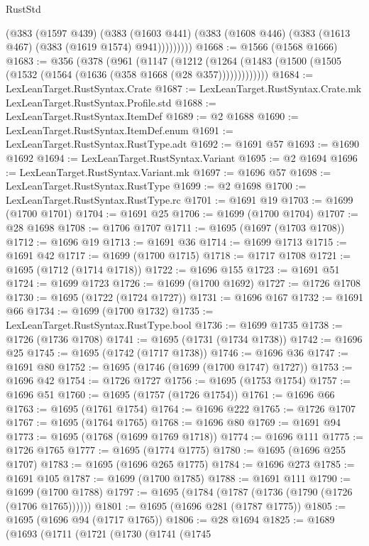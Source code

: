 \begin{lexlean}{RustStd}
\begin{coremodule}
            (@383
              (@1597 @439)
              (@383
                (@1603 @441)
                (@383 (@1608 @446) (@383 (@1613 @467) (@383 (@1619 @1574) @941)))))))))
@1668 := @1566 (@1568 @1666)
@1683 := @356
    (@378
      (@961
        (@1147
          (@1212 (@1264 (@1483 (@1500 (@1505 (@1532 (@1564 (@1636 (@358 @1668 (@28 @357)))))))))))))
@1684 := LexLeanTarget.RustSyntax.Crate
@1687 := LexLeanTarget.RustSyntax.Crate.mk LexLeanTarget.RustSyntax.Profile.std
@1688 := LexLeanTarget.RustSyntax.ItemDef
@1689 := @2 @1688
@1690 := LexLeanTarget.RustSyntax.ItemDef.enum
@1691 := LexLeanTarget.RustSyntax.RustType.adt
@1692 := @1691 @57
@1693 := @1690 @1692
@1694 := LexLeanTarget.RustSyntax.Variant
@1695 := @2 @1694
@1696 := LexLeanTarget.RustSyntax.Variant.mk
@1697 := @1696 @57
@1698 := LexLeanTarget.RustSyntax.RustType
@1699 := @2 @1698
@1700 := LexLeanTarget.RustSyntax.RustType.rc
@1701 := @1691 @19
@1703 := @1699 (@1700 @1701)
@1704 := @1691 @25
@1706 := @1699 (@1700 @1704)
@1707 := @28 @1698
@1708 := @1706 @1707
@1711 := @1695 (@1697 (@1703 @1708))
@1712 := @1696 @19
@1713 := @1691 @36
@1714 := @1699 @1713
@1715 := @1691 @42
@1717 := @1699 (@1700 @1715)
@1718 := @1717 @1708
@1721 := @1695 (@1712 (@1714 @1718))
@1722 := @1696 @155
@1723 := @1691 @51
@1724 := @1699 @1723
@1726 := @1699 (@1700 @1692)
@1727 := @1726 @1708
@1730 := @1695 (@1722 (@1724 @1727))
@1731 := @1696 @167
@1732 := @1691 @66
@1734 := @1699 (@1700 @1732)
@1735 := LexLeanTarget.RustSyntax.RustType.bool
@1736 := @1699 @1735
@1738 := @1726 (@1736 @1708)
@1741 := @1695 (@1731 (@1734 @1738))
@1742 := @1696 @25
@1745 := @1695 (@1742 (@1717 @1738))
@1746 := @1696 @36
@1747 := @1691 @80
@1752 := @1695 (@1746 (@1699 (@1700 @1747) @1727))
@1753 := @1696 @42
@1754 := @1726 @1727
@1756 := @1695 (@1753 @1754)
@1757 := @1696 @51
@1760 := @1695 (@1757 (@1726 @1754))
@1761 := @1696 @66
@1763 := @1695 (@1761 @1754)
@1764 := @1696 @222
@1765 := @1726 @1707
@1767 := @1695 (@1764 @1765)
@1768 := @1696 @80
@1769 := @1691 @94
@1773 := @1695 (@1768 (@1699 @1769 @1718))
@1774 := @1696 @111
@1775 := @1726 @1765
@1777 := @1695 (@1774 @1775)
@1780 := @1695 (@1696 @255 @1707)
@1783 := @1695 (@1696 @265 @1775)
@1784 := @1696 @273
@1785 := @1691 @105
@1787 := @1699 (@1700 @1785)
@1788 := @1691 @111
@1790 := @1699 (@1700 @1788)
@1797 := @1695 (@1784 (@1787 (@1736 (@1790 (@1726 (@1706 @1765))))))
@1801 := @1695 (@1696 @281 (@1787 @1775))
@1805 := @1695 (@1696 @94 (@1717 @1765))
@1806 := @28 @1694
@1825 := @1689
    (@1693
      (@1711
        (@1721
          (@1730
            (@1741
              (@1745

\end{coremodule}
\end{lexlean}
